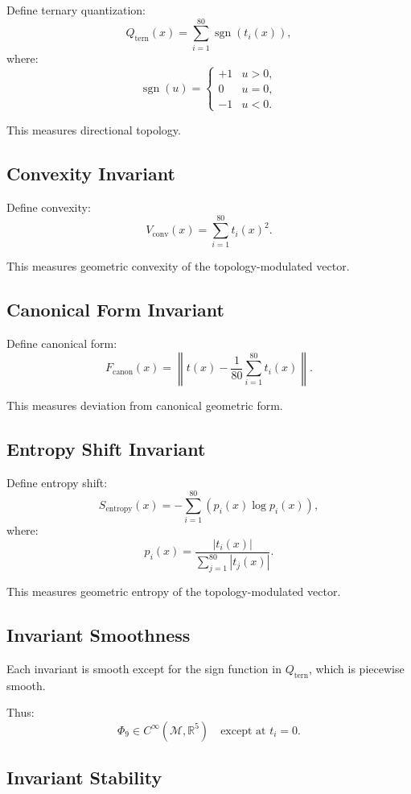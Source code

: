 Define ternary quantization:
\[
Q_{\text{tern}}(x)
= \sum_{i=1}^{80} \operatorname{sgn}(t_i(x)),
\]
where:
\[
\operatorname{sgn}(u) =
\begin{cases}
+1 & u > 0, \\
0 & u = 0, \\
-1 & u < 0.
\end{cases}
\]

This measures directional topology.

\subsection{Convexity Invariant}

Define convexity:
\[
V_{\text{conv}}(x)
= \sum_{i=1}^{80} t_i(x)^2.
\]

This measures geometric convexity of the topology-modulated vector.

\subsection{Canonical Form Invariant}

Define canonical form:
\[
F_{\text{canon}}(x)
= \left\| t(x) - \frac{1}{80}\sum_{i=1}^{80} t_i(x) \right\|.
\]

This measures deviation from canonical geometric form.

\subsection{Entropy Shift Invariant}

Define entropy shift:
\[
S_{\text{entropy}}(x)
= -\sum_{i=1}^{80}
\left(
p_i(x) \log p_i(x)
\right),
\]
where:
\[
p_i(x) = \frac{|t_i(x)|}{\sum_{j=1}^{80} |t_j(x)|}.
\]

This measures geometric entropy of the topology-modulated vector.

\subsection{Invariant Smoothness}

Each invariant is smooth except for the sign function in $Q_{\text{tern}}$,
which is piecewise smooth.

Thus:
\[
\Phi_9 \in C^\infty(\mathcal{M}, \mathbb{R}^5)
\quad\text{except at } t_i = 0.
\]

\subsection{Invariant Stability}

